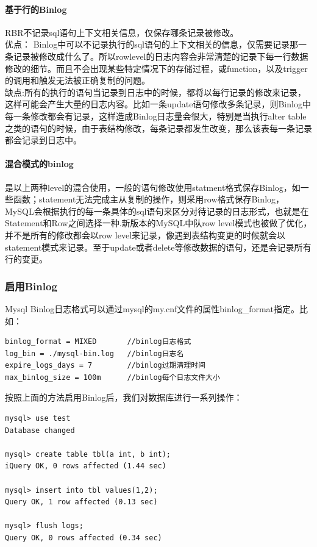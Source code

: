 \documentclass[a4paper, titlepage, 10pt, bookmark]{article}
\begin{document}
\paragraph{基于行的Binlog}
RBR不记录sql语句上下文相关信息，仅保存哪条记录被修改。\\

优点： Binlog中可以不记录执行的sql语句的上下文相关的信息，仅需要记录那一条记录被修改成什么了。所以rowlevel的日志内容会非常清楚的记录下每一行数据修改的细节。而且不会出现某些特定情况下的存储过程，或function，以及trigger的调用和触发无法被正确复制的问题。\\

缺点:所有的执行的语句当记录到日志中的时候，都将以每行记录的修改来记录，这样可能会产生大量的日志内容。比如一条update语句修改多条记录，则Binlog中每一条修改都会有记录，这样造成Binlog日志量会很大，特别是当执行alter table之类的语句的时候，由于表结构修改，每条记录都发生改变，那么该表每一条记录都会记录到日志中。

\paragraph{混合模式的binlog}
是以上两种level的混合使用，一般的语句修改使用statment格式保存Binlog，如一些函数；statement无法完成主从复制的操作，则采用row格式保存Binlog，MySQL会根据执行的每一条具体的sql语句来区分对待记录的日志形式，也就是在Statement和Row之间选择一种.新版本的MySQL中队row level模式也被做了优化，并不是所有的修改都会以row level来记录，像遇到表结构变更的时候就会以statement模式来记录。至于update或者delete等修改数据的语句，还是会记录所有行的变更。

\subsubsection{启用Binlog}
Mysql Binlog日志格式可以通过mysql的my.cnf文件的属性binlog\_format指定。比如：
\begin{spacing}{1.0}
\begin{lstlisting}
binlog_format = MIXED       //binlog日志格式
log_bin = ./mysql-bin.log   //binlog日志名
expire_logs_days = 7        //binlog过期清理时间
max_binlog_size = 100m      //binlog每个日志文件大小
\end{lstlisting}
\end{spacing}

按照上面的方法启用Binlog后，我们对数据库进行一系列操作：
\begin{spacing}{1.0}
\begin{lstlisting}
mysql> use test
Database changed

mysql> create table tbl(a int, b int);
iQuery OK, 0 rows affected (1.44 sec)

mysql> insert into tbl values(1,2);
Query OK, 1 row affected (0.13 sec)

mysql> flush logs;
Query OK, 0 rows affected (0.34 sec)
\end{lstlisting}
\end{spacing}
\end{document}
